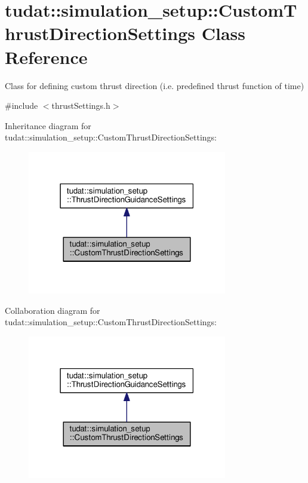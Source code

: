 \hypertarget{classtudat_1_1simulation__setup_1_1CustomThrustDirectionSettings}{}\section{tudat\+:\+:simulation\+\_\+setup\+:\+:Custom\+Thrust\+Direction\+Settings Class Reference}
\label{classtudat_1_1simulation__setup_1_1CustomThrustDirectionSettings}


Class for defining custom thrust direction (i.\+e. predefined thrust function of time)  




{\ttfamily \#include $<$thrust\+Settings.\+h$>$}



Inheritance diagram for tudat\+:\+:simulation\+\_\+setup\+:\+:Custom\+Thrust\+Direction\+Settings\+:
\nopagebreak
\begin{figure}[H]
\begin{center}
\leavevmode
\includegraphics[width=247pt]{classtudat_1_1simulation__setup_1_1CustomThrustDirectionSettings__inherit__graph}
\end{center}
\end{figure}


Collaboration diagram for tudat\+:\+:simulation\+\_\+setup\+:\+:Custom\+Thrust\+Direction\+Settings\+:
\nopagebreak
\begin{figure}[H]
\begin{center}
\leavevmode
\includegraphics[width=247pt]{classtudat_1_1simulation__setup_1_1CustomThrustDirectionSettings__coll__graph}
\end{center}
\end{figure}
